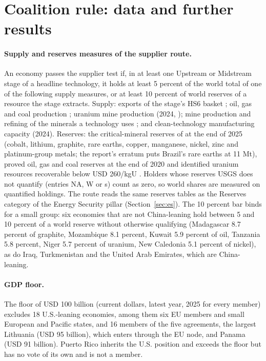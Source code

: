 \section{Coalition rule: data and further results}\label{oa:coalition}

\paragraph{Supply and reserves measures of the supplier route.} An economy passes the supplier test
if, in at least one Upstream or Midstream stage of a headline technology, it holds at least 5
percent of the world total of one of the following supply measures, or at least 10 percent of world
reserves of a resource the stage extracts. Supply: exports of the stage's HS6 basket
\citep[2023;][]{growthlab2019trade}; oil, gas and coal production \citep[2025;][]{ei2026statistical};
uranium mine production (2024, \citealp{oecdnea2026uranium}); mine production and refining of the
minerals a technology uses \citep[2025;][with manganese, zinc and platinum-group metals from the
Energy Institute]{iea2026cmdata}; and clean-technology manufacturing capacity (2024). Reserves: the
critical-mineral reserves of \citet{usgs2026mcs} at the end of 2025 (cobalt, lithium, graphite, rare
earths, copper, manganese, nickel, zinc and platinum-group metals; the report's erratum puts Brazil's
rare earths at 11 Mt), proved oil, gas and coal reserves at the end of 2020 \citep{ei2026statistical}
and identified uranium resources recoverable below USD 260/kgU \citep{oecdnea2026uranium}. Holders
whose reserves USGS does not quantify (entries NA, W or s) count as zero, so world shares are
measured on quantified holdings. The route reads the same reserves tables as the Reserves category
of the Energy Security pillar (Section~\ref{sec:es}). The 10 percent bar binds for a small group:
six economies that are not China-leaning hold between 5 and 10 percent of a world reserve without
otherwise qualifying (Madagascar 8.7 percent of graphite, Mozambique 8.1 percent, Kuwait 5.9 percent
of oil, Tanzania 5.8 percent, Niger 5.7 percent of uranium, New Caledonia 5.1 percent of nickel), as
do Iraq, Turkmenistan and the United Arab Emirates, which are China-leaning.

\paragraph{GDP floor.} The floor of USD 100 billion (current dollars, latest year, 2025 for every
member) excludes 18 U.S.-leaning economies, among them six EU members and small European and Pacific
states, and 16 members of the five agreements, the largest Lithuania (USD 95 billion), which enters
through the EU node, and Panama (USD 91 billion). Puerto Rico inherits the U.S. position and exceeds
the floor but has no vote of its own and is not a member.

